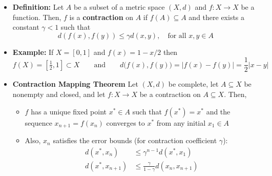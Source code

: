 \documentclass[11pt,twoside]{report}
\begin{document}
\begin{itemize}

\item \textbf{Definition:} Let $A$ be a subset of a metric space $(X,d)$ and $f \colon X \rightarrow X$ be a function. Then, $f$ is a \textbf{contraction} on $A$ if $f(A) \subseteq A$ and there exists a constant $\gamma < 1$ such that
\[
d \left( f(x),f(y) \right) \le \gamma  d(x,y), \quad \text{for all $x,y \in A$} 
\]



\item \textbf{Example:} If $X=[0,1]$  and $f(x) = 1 - x/2$ then 
 \[
 f(X) = [\tfrac{1}{2},1] \subset X \qquad \text{and} \qquad 
  d\big(f(x),f(y)\big)=|f(x)-f(y)| = \frac{1}{2}|x-y|
 \] 


\begin{center}
\end{center}

\item \textbf{Contraction Mapping Theorem}
Let $(X,d)$ be complete, let $A\subseteq X$ be nonempty and closed, and let $f\colon X\to X$ be a contraction on $A \subseteq X$.
Then, 
\begin{itemize}
\setlength\itemsep{3mm}
  \item $f$ has a unique fixed point $x^* \in A$ such that $f(x^*) = x^*$ and the sequence $x_{n+1} = f(x_n)$ converges to $x^*$ from any initial $x_1 \in A$
  \item Also, $x_n$ satisfies the error bounds (for contraction coefficient $\gamma$): \vspace{-2mm} \begin{align*} d(x^*,x_n) &\le \gamma^{n-1} d(x^*,x_1) \\ d(x^*,x_{n+1}) &\leq  \frac{ \gamma}{ 1- \gamma} d(x_n,x_{n+1})
   \end{align*}
\end{itemize}



\end{itemize}
\end{document}
